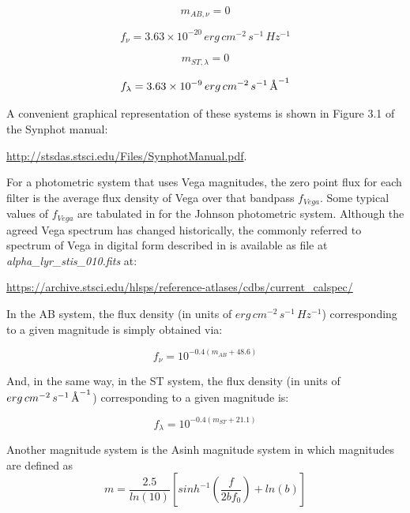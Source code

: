 \documentclass[11pt,a4paper]{ivoa}
\newcommand{\angstrom}{\mbox{\normalfont\AA}}
\begin{document}
\begin{equation} \label{eq:7_0}
m_{AB,\nu } = 0
\end{equation}

\begin{equation} \label{eq:8}
f_\nu = 3.63\times 10^{-20}\,erg\,cm^{-2}\,s^{-1}\,Hz^{-1}
\end{equation}

\begin{equation} \label{eq:9}
m_{ST,\lambda } = 0
\end{equation}

\begin{equation} \label{eq:10}
f_\lambda = 3.63\times 10^{-9}\,erg\,cm^{-2}\,s^{-1}\,\angstrom^{-1}
\end{equation}


A convenient graphical representation of these systems is shown in
Figure 3.1 of the Synphot manual:

\url{http://stsdas.stsci.edu/Files/SynphotManual.pdf}.
\par

For a photometric system that uses Vega magnitudes, the zero point
flux for each filter is the average flux density of Vega over that
bandpass $f_{Vega}$. Some typical values of $f_{Vega}$ are tabulated in
\citep{2001eaa..book.....M} for the Johnson photometric system. Although
the agreed Vega spectrum has changed historically, the commonly referred to
spectrum of Vega in digital form described in \citep{2004AJ....127.3508B}
is available as file at \emph{alpha\_lyr\_stis\_010.fits} at:\par
\url{https://archive.stsci.edu/hlsps/reference-atlases/cdbs/current_calspec/}
\par

In the AB system, the flux density (in units of $erg\, cm^{-2}\, s^{-1}\, Hz^{-1}$)
corresponding to a given magnitude is simply obtained via:

\begin{equation} \label{eq:11}
f_{\nu} = 10^{-0.4(m_{AB}+48.6)}
\end{equation}

And, in the same way, in the ST system, the flux density (in units of $erg\,
cm^{-2}\, s^{-1}\, \angstrom^{-1}$) corresponding to a given magnitude is:

\begin{equation} \label{eq:12}
f_{\lambda} = 10^{-0.4(m_{ST}+21.1)}
\end{equation}

Another magnitude system is the Asinh magnitude system in which magnitudes
are defined as
\begin{equation} \label{eq:13}
m = \frac{2.5}{ln(10)} \left[ sinh^{-1}(\frac{f}{2bf_0}) +ln(b) \right]
\end{equation}
\end{document}

